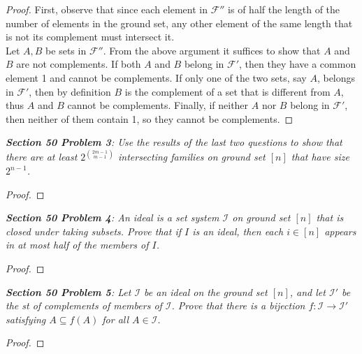 \documentclass{article}
\begin{document}
  \begin{proof}
    First, observe that since each element in $\mathcal{F}''$ is of half
    the length of the number of elements in the ground set, any other
    element of the same length that is not its complement must intersect
    it. \\

    Let $A,B$ be sets in $\mathcal{F}''$. From the above argument it
    suffices to show that $A$ and $B$ are not complements. If both $A$ and
    $B$ belong in $\mathcal{F}'$, then they have a common element 1 and
    cannot be complements. If only one of the two sets, say $A$,
    belongs in $\mathcal{F}'$, then by definition $B$ is the complement of
    a set that is different from $A$, thus $A$ and $B$ cannot be
    complements. Finally, if neither $A$ nor $B$ belong in $\mathcal{F}'$,
    then neither of them contain 1, so they cannot be complements.
  \end{proof}

\it \textbf{Section 50 Problem 3}: Use the results of the last two
  questions to show that there are at least $2^{\binom{2m-1}{m-1}}$
  intersecting families on ground set $[n]$ that have size $2^{n-1}$.

  \begin{proof}
  \end{proof}

\it \textbf{Section 50 Problem 4}: An ideal is a set system $\mathcal{I}$
  on ground set $[n]$ that is closed under taking subsets. Prove that if
  $I$ is an ideal, then each $i\in[n]$ appears in at most half of
  the members of $I$.

  \begin{proof}
  \end{proof}

\it \textbf{Section 50 Problem 5}: Let $\mathcal{I}$ be an ideal on the
  ground set $[n]$, and let $\mathcal{I}'$ be the st of complements of
  members of $\mathcal{I}$. Prove that there is a bijection
  $f:\mathcal{I}\rightarrow\mathcal{I}'$ satisfying $A\subseteq f(A)$ for
  all $A\in\mathcal{I}$.

  \begin{proof}
  \end{proof}
\end{document}
